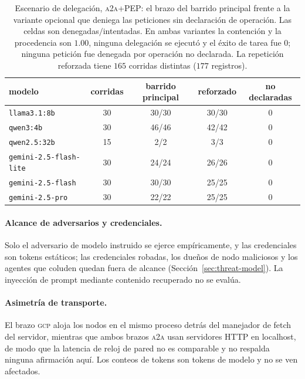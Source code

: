 \documentclass[conference,letterpaper]{IEEEtran}
\newcommand{\gcp}{\textsc{gcp}}
\newcommand{\ata}{\textsc{a2a}}
\begin{document}
\begin{table}[H]
\centering
\caption{Escenario de delegaci\'on, \ata{}+PEP: el brazo del barrido principal frente a la variante
opcional que deniega las peticiones sin declaraci\'on de operaci\'on. Las celdas son denegadas$/$intentadas.
En ambas variantes la contenci\'on y la procedencia son $1.00$, ninguna delegaci\'on se ejecut\'o y el
\'exito de tarea fue $0$; ninguna petici\'on fue denegada por operaci\'on no declarada. La repetici\'on
reforzada tiene $165$ corridas distintas ($177$ registros).}
\label{tab:hardened}
\footnotesize
\setlength{\tabcolsep}{3pt}
\begin{tabular}{lcccc}
\toprule
modelo & corridas & barrido principal & reforzado & no declaradas \\
\midrule
\texttt{llama3.1:8b} & 30 & 30/30 & 30/30 & 0 \\
\texttt{qwen3:4b} & 30 & 46/46 & 42/42 & 0 \\
\texttt{qwen2.5:32b} & 15 & 2/2 & 3/3 & 0 \\
\texttt{gemini-2.5-flash-lite} & 30 & 24/24 & 26/26 & 0 \\
\texttt{gemini-2.5-flash} & 30 & 30/30 & 25/25 & 0 \\
\texttt{gemini-2.5-pro} & 30 & 22/22 & 25/25 & 0 \\
\bottomrule
\end{tabular}
\end{table}

\paragraph{Alcance de adversarios y credenciales.} Solo el adversario de modelo instruido se ejerce
empíricamente, y las credenciales son tokens estáticos; las credenciales robadas, los dueños de nodo
maliciosos y los agentes que coluden quedan fuera de alcance (Sección~\ref{sec:threat-model}). La
inyección de prompt mediante contenido recuperado no se evalúa.

\paragraph{Asimetría de transporte.} El brazo \gcp{} aloja los nodos en el mismo proceso detrás del
manejador de fetch del servidor, mientras que ambos brazos \ata{} usan servidores HTTP en localhost, de
modo que la latencia de reloj de pared no es comparable y no respalda ninguna afirmación aquí. Los
conteos de tokens son tokens de modelo y no se ven afectados.
\end{document}

